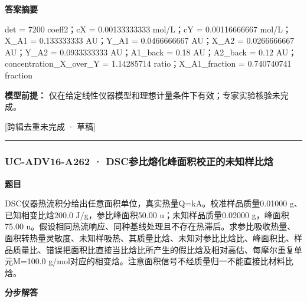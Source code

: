 \documentclass[UTF8,11pt,a4paper]{ctexart}
\begin{document}
\noindent\textbf{答案摘要}\par
det = 7200 coeff2；cX = 0.00133333333 mol/L；cY = 0.00116666667 mol/L；X\_A1 = 0.133333333 AU；Y\_A1 = 0.0466666667 AU；X\_A2 = 0.0266666667 AU；Y\_A2 = 0.0933333333 AU；A1\_back = 0.18 AU；A2\_back = 0.12 AU；concentration\_X\_over\_Y = 1.14285714 ratio；X\_A1\_fraction = 0.740740741 fraction\par
\noindent\textbf{模型前提：}
仅在给定线性仪器模型和理想计量条件下有效；专家实验核验未完成。\par
\noindent\textcolor{red!65!black}{[跨辑去重未完成 · 草稿]} \par
\medskip\hrule\medskip
{}
\subsubsection*{UC-ADV16-A262 · DSC参比熔化峰面积校正的未知样比焓}
\noindent\textbf{题目}\par
DSC仪器热流积分给出任意面积单位，真实热量Q=kA。校准样品质量0.01000 g、已知相变比焓200.0 J/g，参比峰面积50.00 u；未知样品质量0.02000 g，峰面积75.00 u。假设相同热流响应、同种基线处理且不存在热滞后。求参比吸收热量、面积转热量灵敏度、未知样吸热、其质量比焓、未知对参比比焓比、峰面积比、样品质量比、错误把面积比直接当比焓比所产生的假比焓及相对高估、每摩尔重复单元M=100.0 g/mol对应的相变焓。注意面积信号不经质量归一不能直接比材料比焓。\par
\medskip\noindent\textbf{分步解答}
\end{document}
